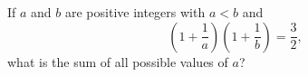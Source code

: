 If $a$ and $b$ are positive integers with $a<b$ and
\[\left(1+\dfrac{1}{a}\right)\left(1+\dfrac{1}{b}\right)=\dfrac{3}{2},\]
what is the sum of all possible values of $a$?

